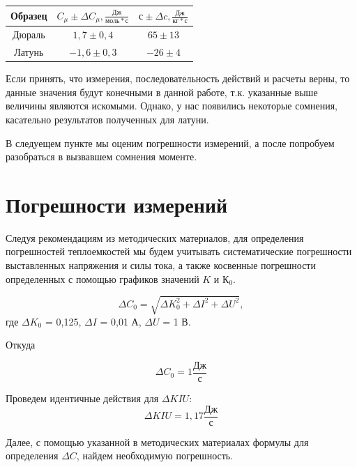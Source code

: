 \documentclass[a4paper,12pt]{article}
\begin{document}
\begin{center}

	\begin{tabular}{|c|c|c|}
		\hline
		Образец&	$C_\mu \pm \Delta C_\mu, \frac{Дж}{моль*с}$&	$с \pm \Delta c, \frac{Дж}{кг*с}$
		\\
		\hline
		Дюраль&		$1,7\pm0,4$&	$65\pm13$
		\\
		Латунь&		$-1,6\pm0,3$&	$-26\pm4$
		\\
		\hline		
	
	\end{tabular}
\end{center}

\hspace{\parindent}Если принять, что измерения, последовательность действий и расчеты верны, то данные значения будут конечными в данной работе, т.к. указанные выше величины являются искомыми. Однако, у нас появились некоторые сомнения, касательно результатов полученных для латуни.

\hspace{\parindent}В следуещем пункте мы оценим погрешности измерений, а после попробуем разобраться в вызвавшем сомнения моменте.

\newpage
\section{Погрешности измерений}

\hspace{\parindent}Следуя рекомендациям из методических материалов, для определения погрешностей теплоемкостей мы будем учитывать систематические погрешности выставленных напряжения и силы тока, а также косвенные погрешности определенных с помощью графиков значений $K$ и $К_0$.

$$\Delta C_0 = \sqrt{\Delta K_0^2 + \Delta I^2 + \Delta U^2},$$
где $\Delta K_0$ = 0,125, $\Delta I$ = 0,01 А, $\Delta U$ = 1 В.

\vspace{10,25pt}
\hspace{\parindent}Откуда

$$\Delta C_0 = 1 \frac{Дж}{с}$$

\hspace{\parindent}Проведем идентичные действия для $\Delta KIU$:
$$\Delta KIU = 1,17 \frac{Дж}{с}$$

\hspace{\parindent}Далее, с помощью указанной в методических материалах формулы для определения $\Delta C$, найдем необходимую погрешность.
\end{document}
